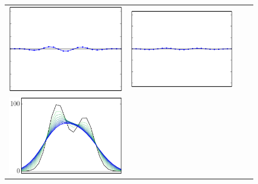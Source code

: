 \documentclass[11pt,preprint]{aastex}
\begin{document}
\begin{figure}
\begin{center}
\begin{tabular}{@{}c@{}c@{}c@{}c@{}}
\includegraphics[height=\figh]{plots3/boxes-06} &
\includegraphics[height=\figh]{plots3/boxes-07} \\
%
\includegraphics[height=\figh]{plots3/boxes-08} &

\end{tabular}
\end{center}
\end{figure}
\end{document}
